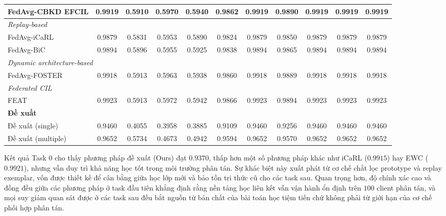 \begin{table}[H]
{\begin{tabular}{lcccccccccc}
        FedAvg-CBKD EFCIL & 0.9919 & 0.5910 & \cellcolor{green!30}0.5970 & \cellcolor{green!30}0.5940 & 0.9862 & 0.9919 & 0.9890 & 0.9919 & 0.9919 & 0.9919 \\
        \hline
        \multicolumn{11}{l}{\textit{Replay-based}} \\
        FedAvg-iCaRL & 0.9879 & 0.5831 & 0.5953 & 0.5890 & 0.9824 & 0.9879 & 0.9850 & 0.9879 & 0.9879 & 0.9879 \\
        FedAvg-BiC & 0.9894 & 0.5896 & 0.5955 & 0.5925 & 0.9838 & 0.9894 & 0.9865 & 0.9894 & 0.9894 & 0.9894 \\
        \hline
        \multicolumn{11}{l}{\textit{Dynamic architecture-based}} \\
        FedAvg-FOSTER & 0.9918 & \cellcolor{green!90!black}0.5913 & 0.5963 & 0.5938 & 0.9860 & 0.9918 & 0.9889 & 0.9918 & 0.9918 & 0.9918 \\
        \hline
        \multicolumn{11}{l}{\textit{Federated CIL}} \\
        FEAT & \cellcolor{green!60!black}0.9923 & \cellcolor{green!30}0.5913 & \cellcolor{green!60!black}0.5972 & \cellcolor{green!60!black}0.5942 & \cellcolor{green!60!black}0.9866 & \cellcolor{green!60!black}0.9923 & \cellcolor{green!60!black}0.9894 & \cellcolor{green!60!black}0.9923 & \cellcolor{green!60!black}0.9923 & \cellcolor{green!60!black}0.9923 \\
        \hline
        \multicolumn{11}{l}{\textbf{Đề xuất}} \\
        Đề xuất (single) & 0.9460 & 0.4055 & 0.3958 & 0.3885 & 0.9109 & 0.9460 & 0.9256 & 0.9460 & 0.9460 & 0.9460 \\
        Đề xuất (multiple) & 0.9652 & 0.5734 & 0.4673 & 0.4942 & 0.9594 & 0.9652 & 0.9570 & 0.9652 & 0.9652 & 0.9652 \\
        \hline
    \end{tabular}}
\end{table}



Kết quả Task 0 cho thấy phương pháp đề xuất (Ours) đạt $0.9370$, thấp hơn một số phương pháp khác như iCaRL ($0.9915$) hay EWC ($0.9921$), nhưng vẫn duy trì khả năng học tốt trong môi trường phân tán. Sự khác biệt này xuất phát từ cơ chế chắt lọc prototype và replay exemplar, vốn được thiết kế để cân bằng giữa học lớp mới và bảo tồn tri thức cũ cho các task sau. Quan trọng hơn, độ chính xác cao và đồng đều giữa các phương pháp ở task đầu tiên khẳng định rằng nền tảng học liên kết vẫn vận hành ổn định trên $100$ client phân tán, và mọi suy giảm quan sát được ở các task sau đều bắt nguồn từ bản chất của bài toán học tiệm tiến chứ không phải từ giới hạn của cơ chế phối hợp phân tán.

